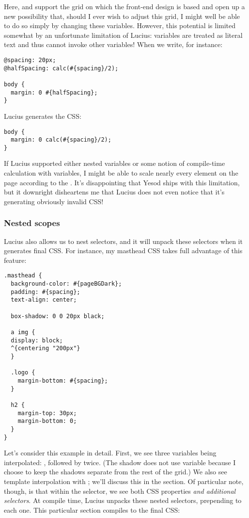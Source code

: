 Here,  and  support the grid on which the front-end design is based and open up a new possibility that, should I ever wish to adjust this grid, I might well be able to do so simply by changing these variables. However, this potential is limited somewhat by an unfortunate limitation of Lucius: variables are treated as literal text and thus cannot invoke other variables! When we write, for instance: 

\begin{Verbatim}
@spacing: 20px;
@halfSpacing: calc(#{spacing}/2);

body {
  margin: 0 #{halfSpacing};
}
\end{Verbatim}

Lucius generates the CSS:

\begin{Verbatim}
body {
  margin: 0 calc(#{spacing}/2);
}
\end{Verbatim}

If Lucius supported either nested variables or some notion of compile-time calculation with variables, I might be able to scale nearly every element on the page according to the . It's disappointing that Yesod ships with this limitation, but it downright disheartens me that Lucius does not even notice that it's generating obviously invalid CSS!

\subsubsection{Nested scopes} \label{luciusNestedScopes}

Lucius also allows us to nest selectors, and it will unpack these selectors when it generates final CSS. For instance, my masthead CSS takes full advantage of this feature:

\begin{Verbatim}
.masthead {
  background-color: #{pageBGDark};
  padding: #{spacing};
  text-align: center;
  
  box-shadow: 0 0 20px black;

  a img {
  display: block;
  ^{centering "200px"}
  }
  
  .logo {
    margin-bottom: #{spacing};
  }

  h2 {
    margin-top: 30px;
    margin-bottom: 0;
  }
}
\end{Verbatim}

Let's consider this example in detail. First, we see three variables being interpolated: , followed by  twice. (The shadow does not use  variable because I choose to keep the shadows separate from the rest of the grid.) We also see template interpolation with ; we'll discuss this in the  section. Of particular note, though, is that within the  selector, we see both CSS properties \emph{and additional selectors}. At compile time, Lucius unpacks these nested selectors, prepending  to each one. This particular section compiles to the final CSS:

